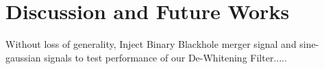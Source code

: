 




\chapter{Discussion and Future Works}

Without loss of generality, Inject Binary Blackhole merger signal and sine-gaussian signals to test performance of our De-Whitening Filter.....

  

